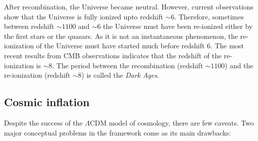 After recombination, the Universe became neutral. However, current observations
show that the Universe is fully ionized upto redshift $\sim 6$. Therefore, 
sometimes between redshift $\sim 1100$ and $\sim 6$ the Universe must have been
re-ionized either by the first stars or the quasars. As it is not an 
instantaneous phenomenon, the re-ionization of the Universe must have
started much before redshift $6$. The most recent results from
CMB observations indicates that the redshift of the re-ionization is
$\sim 8$. The period between the recombination (redshift $\sim 1100$)
and the re-ionization (redshift $\sim 8$) is called the {\it Dark Ages}.


\subsection{Cosmic inflation}

Despite the success of the $\Lambda$CDM model of cosmology, there are few caveats.
Two major conceptual problems in the framework come as its main drawbacks:

